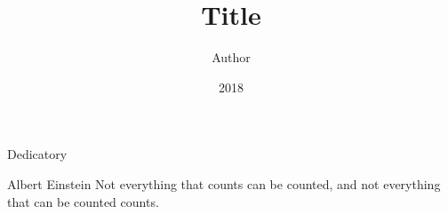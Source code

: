 \documentclass[pt,oneside,onehalfspacing,msc]{risethesis}
\title{Title}
\date{2018}
\author{Author}
\begin{document}
\frontmatter

\frontpage

\begin{fichacatalografica}
	\FakeFichaCatalografica %
\end{fichacatalografica}

\presentationpage

\banca

\begin{dedicatory}
	Dedicatory
\end{dedicatory}

\acknowledgements


\begin{epigraph}[]{Albert Einstein}
Not everything that counts can be counted, and not everything that can be counted counts.
\end{epigraph}

\resumo


\abstract


\listoffigures

\listoftables

\listofalgorithms

\listofacronyms


\tableofcontents

\mainmatter








\begin{references}
  
\end{references}


%
\end{document}
